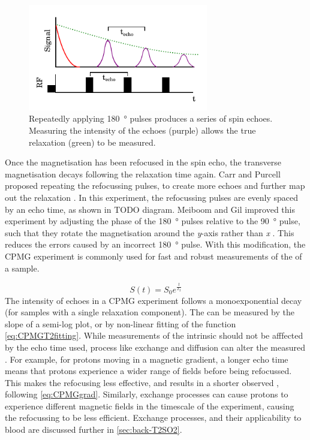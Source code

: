 \begin{figure}[t]
\centering
\includegraphics[width=0.7\textwidth]{figures/background/cpmg.pdf}
\caption[CPMG pulse sequence]{Repeatedly applying \SI{180}{\degree} pulses produces a series of spin echoes. Measuring the intensity of the echoes (purple) allows the true \Ttwo relaxation (green) to be measured.}
\label{fig:back-cpmg}
\end{figure}

Once the magnetisation has been refocused in the spin echo, the transverse magnetisation decays following the \Ttwostar relaxation time again.
Carr and Purcell proposed repeating the refocussing pulses, to create more echoes and further map out the \Ttwo relaxation \cite{CarrEffectsDiffusionFree1954}.
In this experiment, the refocussing pulses are evenly spaced by an echo time, as shown in TODO diagram.
Meiboom and Gil improved this experiment by adjusting the phase of the \SI{180}{\degree} pulses relative to the \SI{90}{\degree} pulse, such that they rotate the magnetisation around the \textit{y}-axis rather than \textit{x} \cite{MeiboomModifiedSpinEcho1958}.
This reduces the errors caused by an incorrect \SI{180}{\degree} pulse.
With this modification, the CPMG experiment is commonly used for fast and robust measurements of the \Ttwo of a sample.

\begin{equation}
S(t) = S_0 e^{\frac{t}{T_2}}
\label{eq:CPMGT2fitting}
\end{equation}
The intensity of echoes in a CPMG experiment follows a monoexponential decay (for samples with a single relaxation component).
The \Ttwo can be measured by the slope of a semi-log plot, or by non-linear fitting of the function \ref{eq:CPMGT2fitting}.
While measurements of the intrinsic \Ttwo should not be afffected by the echo time used, process like exchange and diffusion can alter the measured \Ttwo.
For example, for protons moving in a magnetic gradient, a longer echo time means that protons experience a wider range of \Bzero fields before being refocussed.
This makes the refocusing less effective, and results in a shorter observed \Ttwo, following \autoref{eq:CPMGgrad}.
Similarly, exchange processes can cause protons to experience different magnetic fields in the timescale of the experiment, causing the refocussing to be less efficient.
Exchange processes, and their applicability to blood are discussed further in \autoref{sec:back-T2SO2}.

